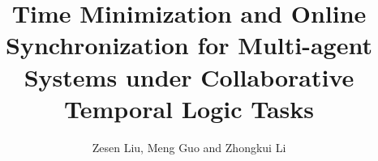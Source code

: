 \documentclass[5p,authoryear]{elsarticle}
\theoremstyle{definition}
\begin{document}
\begin{frontmatter}

\title{Time Minimization and Online Synchronization for Multi-agent Systems under 
	Collaborative Temporal Logic Tasks}


\author{Zesen Liu, Meng Guo and Zhongkui Li }
\address{State Key Laboratory for Turbulence and Complex Systems,Department of Mechanics and Engineering Science,\\
	College of Engineering, Peking University, Beijing 100871, China.}


	
	

\end{frontmatter}
	

	





%
%

%
\end{document}
